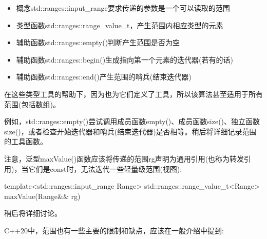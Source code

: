 \begin{itemize}
\item
概念std::ranges::input\_range要求传递的参数是一个可以读取的范围

\item
类型函数std::ranges::range\_value\_t，产生范围内相应类型的元素

\item
辅助函数std::ranges::empty()判断产生范围是否为空

\item
辅助函数std::ranges::begin()生成指向第一个元素的迭代器(若有的话)

\item
辅助函数std::ranges::end()产生范围的哨兵(结束迭代器)
\end{itemize}

在这些类型工具的帮助下，因为也为它们定义了工具，所以该算法甚至适用于所有范围(包括数组)。

例如，std::ranges::empty()尝试调用成员函数empty()、成员函数size()、独立函数size()，或者检查开始迭代器和哨兵(结束迭代器)是否相等。稍后将详细记录范围的工具函数。

注意，泛型maxValue()函数应该将传递的范围rg声明为通用引用(也称为转发引用)，当它们是const时，无法迭代一些轻量级范围(视图):

\begin{cpp}
template<std::ranges::input_range Range>
std::ranges::range_value_t<Range> maxValue(Range&& rg)
\end{cpp}

稍后将详细讨论。


C++20中，范围也有一些主要的限制和缺点，应该在一般介绍中提到:

